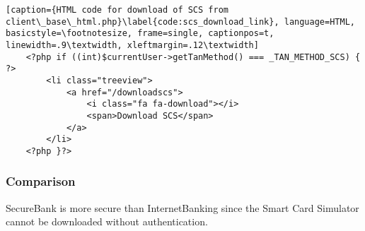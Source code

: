 \begin{lstlisting}[caption={HTML code for download of SCS from client\_base\_html.php}\label{code:scs_download_link}, language=HTML, basicstyle=\footnotesize, frame=single, captionpos=t, linewidth=.9\textwidth, xleftmargin=.12\textwidth]
    <?php if ((int)$currentUser->getTanMethod() === _TAN_METHOD_SCS) { ?>
        <li class="treeview">
            <a href="/downloadscs">
                <i class="fa fa-download"></i>
                <span>Download SCS</span>
            </a>
        </li>
    <?php }?>
\end{lstlisting}

\subsubsection{Comparison}
SecureBank is more secure than InternetBanking since the Smart Card Simulator cannot be downloaded without authentication.
\clearpage